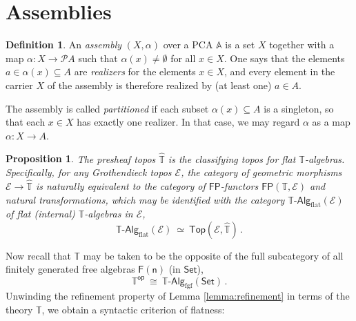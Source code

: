 \documentclass[12pt]{article}
\newcommand{\A}{\ensuremath{\mathbb{A}}}
\newcommand{\T}{\ensuremath{\mathbb{T}}}
\newcommand{\EE}{\ensuremath{\mathcal{E}}}
\newcommand{\PP}{\ensuremath{\mathcal{P}}}
\newcommand{\op}[1]{\ensuremath{{#1}^{\mathsf{op}}}}
\newcommand{\pshat}[1]{\ensuremath{\widehat{#1}}}
\newcommand{\Set}{\ensuremath{\mathsf{Set}}}
\newcommand{\FP}{\ensuremath{\mathsf{FP}}}
\newcommand{\TAlg}{\ensuremath{\T\text{-}\mathsf{Alg}}}
\newcommand{\alg}[1]{\ensuremath{\mathsf{#1}}}
\renewcommand{\to}{\ensuremath{\rightarrow}}
\newtheorem{proposition}[theorem]{Proposition}
\theoremstyle{remark}
\theoremstyle{definition}
\newtheorem{definition}[theorem]{Definition}
\begin{document}
\section{Assemblies}

\begin{definition}
  An \emph{assembly} $(X, \alpha)$ over a PCA $\A$ is a set $X$ together with a map $\alpha : X \to \PP{A}$ such that $\alpha(x) \neq\emptyset$ for all $x\in X$. One says that the elements $a\in \alpha(x)\subseteq A$ are \emph{realizers} for the elements $x \in X$, and every element in the carrier $X$ of the assembly is therefore realized by (at least one) $a\in A$. 
  
The assembly is called \emph{partitioned} if each subset $\alpha(x)\subseteq A$ is a singleton, so that each $x\in X$ has exactly one realizer.  In that case, we may regard $\alpha$ as a map $\alpha : X \to A$.
\end{definition}


\begin{proposition}
The presheaf topos $\pshat{\T}$ is the classifying topos for flat $\T$-algebras.  Specifically, for any Grothendieck topos $\EE$, the category of geometric morphisms $\EE \to \pshat{\T}$ is naturally equivalent to the category of $\FP$-functors $\FP(\T,\EE)$ and natural transformations, which may be identified with the category $\TAlg_{\mathrm{flat}}(\EE)$ of flat (internal) $\T$-algebras in $\EE$,
\[
\TAlg_{\mathrm{flat}}(\EE)\ \simeq\  \mathsf{Top}(\EE, \pshat{\T})\,.
\]
\end{proposition}

Now recall that $\T$ may be taken to be the opposite of the full subcategory of all finitely generated free algebras $\alg{F(n)}$ (in $\Set$),
\[
\op{\T}\ \cong\  {\TAlg_{\mathrm{fgf}}(\Set)}\,.
\]
Unwinding the refinement property of Lemma \ref{lemma:refinement} in terms of the theory $\T$, we obtain a syntactic criterion of flatness:
\end{document}
